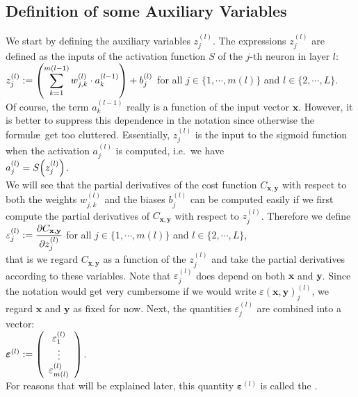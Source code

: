 \subsection{Definition of some Auxiliary Variables}
We start by defining the auxiliary variables $z_j^{(l)}$.
 The expressions $z_j^{(l)}$  are defined as the inputs of the activation function $S$ of the $j$-th neuron in
 layer $l$:
\\[0.2cm]
\hspace*{1.3cm}
$\displaystyle z_j^{(l)} := \left(\sum\limits_{k=1}^{m(l-1)}  w_{j,k}^{(l)} \cdot a_k^{(l-1)}\right) + b_j^{(l)}$
\quad for all  $j \in \{1, \cdots, m(l)\}$ and $l \in \{2,\cdots,L\}$.
\\[0.2cm]
Of course, the term  $a_k^{(l-1)}$ really is a function of the input vector $\mathbf{x}$.  However, it is better to suppress
this dependence in the notation since otherwise the formul\ae\ get too cluttered.
Essentially, $z_j^{(l)}$ is the input to the sigmoid function when the activation $a_j^{(l)}$ is computed,
i.e.~we have
\\[0.2cm]
\hspace*{1.3cm}
$a_j^{(l)} = S\Bigl(z_j^{(l)}\Bigr)$.
\\[0.2cm]
We will see that the partial derivatives of the cost function $C_{\mathbf{x}, \mathbf{y}}$ with respect to both the weights
$w_{j,k}^{(l)}$ and the biases $b_j^{(l)}$ can be computed easily if we first compute the partial derivatives
of $C_{\mathbf{x}, \mathbf{y}}$ with respect to $z_j^{(l)}$.  Therefore we define
\\[0.2cm]
\hspace*{1.3cm}
$\displaystyle\varepsilon_j^{(l)} := \frac{\partial C_{\mathbf{x}, \mathbf{y}}}{\partial z_j^{(l)}}$ \quad for all $j \in \{1, \cdots, m(l)\}$ and $l \in \{2,\cdots, L\}$,
\\[0.2cm]
that is we regard $C_{\mathbf{x}, \mathbf{y}}$ as a function of the $z_j^{(l)}$ and take the partial
derivatives according to these variables.  
Note that $\varepsilon_j^{(l)}$ does depend on both $\mathbf{x}$ and $\mathbf{y}$.  Since the notation would
get very cumbersome if we would write $\varepsilon(\mathbf{x}, \mathbf{y})_j^{(l)}$, we regard $\mathbf{x}$ and
$\mathbf{y}$ as fixed for now.  Next, the quantities $\varepsilon_j^{(l)}$ are combined into a vector:
\\[0.2cm]
\hspace*{1.3cm}
$\boldsymbol{\varepsilon}^{(l)} := \left(
  \begin{array}[c]{c}
    \varepsilon_1^{(l)}      \\
    \vdots             \\
    \varepsilon_{m(l)}^{(l)}  
  \end{array}
  \right)
$.
\\[0.2cm]
For reasons that will be explained later, this quantity $\boldsymbol{\varepsilon}^{(l)}$ is called the .

